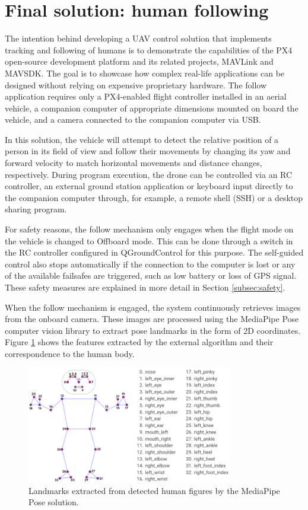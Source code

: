 \section{Final solution: human following}
\label{sec:follow}

The intention behind developing a UAV control solution that implements tracking and following of humans is to demonstrate the capabilities of the PX4 open-source development platform and its related projects, MAVLink and MAVSDK. The goal is to showcase how complex real-life applications can be designed without relying on expensive proprietary hardware. The follow application requires only a PX4-enabled flight controller installed in an aerial vehicle, a companion computer of appropriate dimensions mounted on board the vehicle, and a camera connected to the companion computer via USB.

In this solution, the vehicle will attempt to detect the relative position of a person in its field of view and follow their movements by changing its yaw and forward velocity to match horizontal movements and distance changes, respectively.
During program execution, the drone can be controlled via an RC controller, an external ground station application or keyboard input directly to the companion computer through, for example, a remote shell (SSH) or a desktop sharing program.

For safety reasons, the follow mechanism only engages when the flight mode on the vehicle is changed to Offboard mode. This can be done through a switch in the RC controller configured in QGroundControl for this purpose. The self-guided control also stops automatically if the connection to the computer is lost or any of the available failsafes are triggered, such as low battery or loss of GPS signal. These safety measures are explained in more detail in Section \ref{subsec:safety}.


When the follow mechanism is engaged, the system continuously retrieves images from the onboard camera. These images are processed using the MediaPipe Pose \cite{mp-pose-paper} computer vision library to extract pose landmarks in the form of 2D coordinates.  Figure \ref{fig:pose-landmarks} shows the features extracted by the external algorithm and their correspondence to the human body. 

\begin{figure}[H]
  \centering
  \includegraphics[width=0.8\textwidth, keepaspectratio]{img/pose-landmarks.png}
  \caption{Landmarks extracted from detected human figures by the MediaPipe Pose solution.}
  \label{fig:pose-landmarks}
\end{figure}

